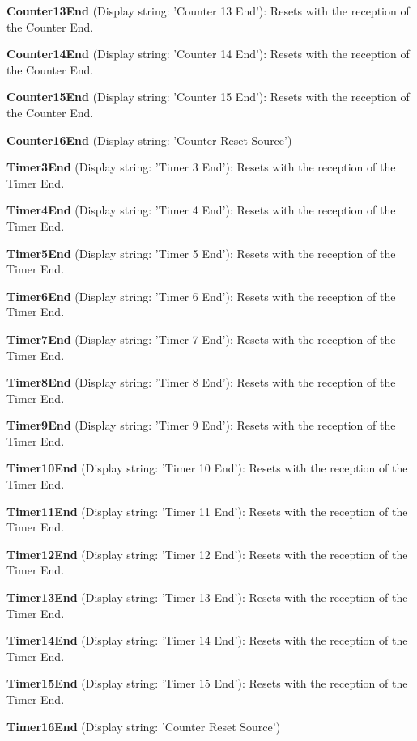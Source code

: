 \begin{DoxyItemize}
\item {\bfseries Counter13\+End} (Display string\+: 'Counter 13 End')\+: Resets with the reception of the Counter End.
\item {\bfseries Counter14\+End} (Display string\+: 'Counter 14 End')\+: Resets with the reception of the Counter End.
\item {\bfseries Counter15\+End} (Display string\+: 'Counter 15 End')\+: Resets with the reception of the Counter End.
\item {\bfseries Counter16\+End} (Display string\+: 'Counter Reset Source')
\item {\bfseries Timer3\+End} (Display string\+: 'Timer 3 End')\+: Resets with the reception of the Timer End.
\item {\bfseries Timer4\+End} (Display string\+: 'Timer 4 End')\+: Resets with the reception of the Timer End.
\item {\bfseries Timer5\+End} (Display string\+: 'Timer 5 End')\+: Resets with the reception of the Timer End.
\item {\bfseries Timer6\+End} (Display string\+: 'Timer 6 End')\+: Resets with the reception of the Timer End.
\item {\bfseries Timer7\+End} (Display string\+: 'Timer 7 End')\+: Resets with the reception of the Timer End.
\item {\bfseries Timer8\+End} (Display string\+: 'Timer 8 End')\+: Resets with the reception of the Timer End.
\item {\bfseries Timer9\+End} (Display string\+: 'Timer 9 End')\+: Resets with the reception of the Timer End.
\item {\bfseries Timer10\+End} (Display string\+: 'Timer 10 End')\+: Resets with the reception of the Timer End.
\item {\bfseries Timer11\+End} (Display string\+: 'Timer 11 End')\+: Resets with the reception of the Timer End.
\item {\bfseries Timer12\+End} (Display string\+: 'Timer 12 End')\+: Resets with the reception of the Timer End.
\item {\bfseries Timer13\+End} (Display string\+: 'Timer 13 End')\+: Resets with the reception of the Timer End.
\item {\bfseries Timer14\+End} (Display string\+: 'Timer 14 End')\+: Resets with the reception of the Timer End.
\item {\bfseries Timer15\+End} (Display string\+: 'Timer 15 End')\+: Resets with the reception of the Timer End.
\item {\bfseries Timer16\+End} (Display string\+: 'Counter Reset Source')

\end{DoxyItemize}
